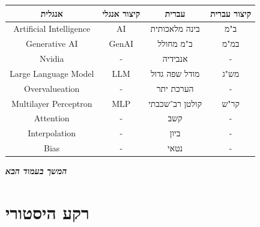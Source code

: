 \documentclass[]{article}
\newcommand\npage {\vfil {\hfil \textbf{\textit{המשך בעמוד הבא}}} \hfil \vfil \pagebreak}
\theoremstyle{definition}
\begin{document}
	\begin{center}
		\begin{tabular}{|c|c|c|c|}
			\hline אנגלית & קיצור אנגלי & עברית & קיצור עברית \\
			\hline Artificial Intelligence & AI & בינה מלאכותית & ב"מ \\
			\hline Generative AI & GenAI & ב"מ מחולל & במ"מ \\
			\hline Nvidia & - & אנבידיה & - \\
			\hline Large Language Model & LLM & מודל שפה גדול & מש"ג \\
			\hline Overvalueation & - & הערכת יתר & - \\
			\hline Multilayer Perceptron & MLP & קולטן רב־שכבתי & קר"ש \\
			\hline Attention & - & קשב & - \\
			\hline Interpolation & - & ביון & - \\
			\hline Bias & - & נטאי & - \\ 
			\hline 
		\end{tabular}
	\end{center}
	
	
	\npage
	
	\section{רקע היסטורי}
\end{document}
